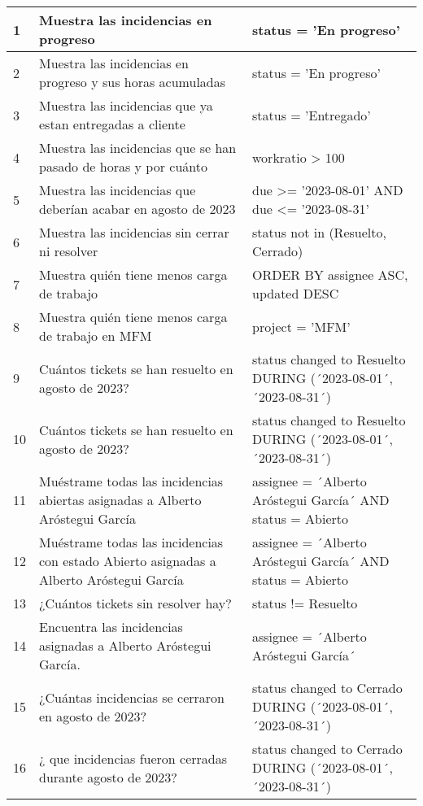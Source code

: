 \begin{center}
\begin{longtable}{ | p{1cm} | p{8cm} | p{6cm} | }
        1 & Muestra las incidencias en progreso & status = 'En progreso' \\
        \hline
        2 & Muestra las incidencias en progreso y sus horas acumuladas & status = 'En progreso'   \\
        \hline
        3 & Muestra las incidencias que ya estan entregadas a cliente  & status = 'Entregado'   \\
        \hline
        4 & Muestra las incidencias que se han pasado de horas y por cuánto  & workratio > 100   \\
        \hline
        5 & Muestra las incidencias que deberían acabar en agosto de 2023  & due >= '2023-08-01' AND due <= '2023-08-31' \\
        \hline
        6 & Muestra las incidencias sin cerrar ni resolver  & status not in (Resuelto, Cerrado)   \\
        \hline
        7 & Muestra quién tiene menos carga de trabajo  &  ORDER BY assignee ASC, updated DESC \\
        \hline
        8 & Muestra quién tiene menos carga de trabajo en MFM  & project = 'MFM' \\
        \hline
        9 & Cuántos tickets se han resuelto en agosto de 2023? & status changed to Resuelto DURING (´2023-08-01´, ´2023-08-31´) \\
        \hline
        10 & Cuántos tickets se han resuelto en agosto de 2023? & status changed to Resuelto DURING (´2023-08-01´, ´2023-08-31´) \\
        \hline
        11 & Muéstrame todas las incidencias abiertas asignadas a Alberto Aróstegui García  &   assignee = ´Alberto Aróstegui García´ AND status = Abierto \\
        \hline
        12 & Muéstrame todas las incidencias con estado Abierto asignadas a Alberto Aróstegui García  &   assignee = ´Alberto Aróstegui García´ AND status = Abierto \\
        \hline
        13 & ¿Cuántos tickets sin resolver hay? &   status != Resuelto \\
        \hline
        14 & Encuentra las incidencias asignadas a Alberto Aróstegui García. &   assignee = ´Alberto Aróstegui García´ \\
        \hline
        15 & ¿Cuántas incidencias se cerraron en agosto de 2023? & status changed to Cerrado DURING (´2023-08-01´, ´2023-08-31´) \\
        \hline
        16 & ¿ que incidencias fueron cerradas durante agosto de 2023? &   status changed to Cerrado DURING (´2023-08-01´, ´2023-08-31´) \\

\end{longtable}
\end{center}
